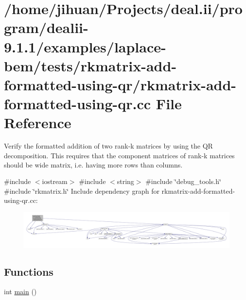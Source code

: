 \hypertarget{rkmatrix-add-formatted-using-qr_8cc}{}\section{/home/jihuan/\+Projects/deal.ii/program/dealii-\/9.1.1/examples/laplace-\/bem/tests/rkmatrix-\/add-\/formatted-\/using-\/qr/rkmatrix-\/add-\/formatted-\/using-\/qr.cc File Reference}
\label{rkmatrix-add-formatted-using-qr_8cc}


Verify the formatted addition of two rank-\/k matrices by using the QR decomposition. This requires that the component matrices of rank-\/k matrices should be wide matrix, i.\+e. having more rows than columns.  


{\ttfamily \#include $<$iostream$>$}\newline
{\ttfamily \#include $<$string$>$}\newline
{\ttfamily \#include \char`\"{}debug\+\_\+tools.\+h\char`\"{}}\newline
{\ttfamily \#include \char`\"{}rkmatrix.\+h\char`\"{}}\newline
Include dependency graph for rkmatrix-\/add-\/formatted-\/using-\/qr.cc\+:\nopagebreak
\begin{figure}[H]
\begin{center}
\leavevmode
\includegraphics[width=350pt]{rkmatrix-add-formatted-using-qr_8cc__incl}
\end{center}
\end{figure}
\subsection*{Functions}
\begin{DoxyCompactItemize}
\item 
int \hyperlink{rkmatrix-add-formatted-using-qr_8cc_ae66f6b31b5ad750f1fe042a706a4e3d4}{main} ()
\end{DoxyCompactItemize}


